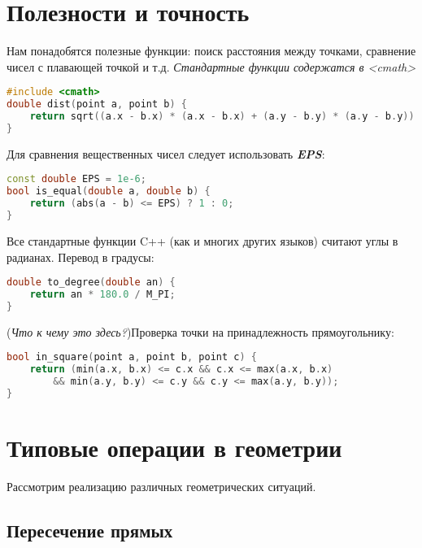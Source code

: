 \section{Полезности и точность}
Нам понадобятся полезные функции: поиск расстояния между точками, сравнение чисел с плавающей точкой и т.д. \newline
\textit{Стандартные функции содержатся в <cmath>}
\begin{lstlisting}[language=C++]
#include <cmath>
double dist(point a, point b) {
    return sqrt((a.x - b.x) * (a.x - b.x) + (a.y - b.y) * (a.y - b.y));
}
\end{lstlisting}
Для сравнения вещественных чисел следует использовать \textbf{\textit{EPS}}:
\begin{lstlisting}[language=C++]
const double EPS = 1e-6;
bool is_equal(double a, double b) {
    return (abs(a - b) <= EPS) ? 1 : 0;
}
\end{lstlisting}
Все стандартные функции C++ (как и многих других языков) считают углы в радианах. Перевод в градусы:\newline
\begin{lstlisting}[language=C++]
double to_degree(double an) {
    return an * 180.0 / M_PI;
}
\end{lstlisting}
(\textit{Что к чему это здесь?})Проверка точки на принадлежность прямоугольнику:
\begin{lstlisting}[language=C++]
bool in_square(point a, point b, point c) {
	return (min(a.x, b.x) <= c.x && c.x <= max(a.x, b.x) 
		&& min(a.y, b.y) <= c.y && c.y <= max(a.y, b.y));
}
\end{lstlisting}

\section{Типовые операции в геометрии}
Рассмотрим реализацию различных геометрических ситуаций. 

\subsection{Пересечение прямых}

